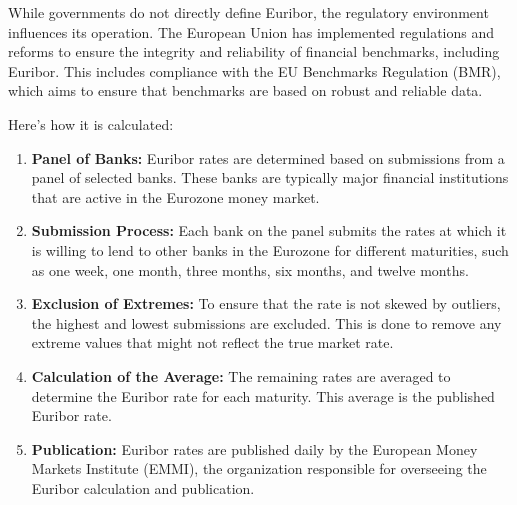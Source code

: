 \documentclass{article}
\begin{document}
While governments do not directly define Euribor, the regulatory environment influences its operation. The European Union has implemented regulations and reforms to ensure the integrity and reliability of financial benchmarks, including Euribor. This includes compliance with the EU Benchmarks Regulation (BMR), which aims to ensure that benchmarks are based on robust and reliable data.

Here's how it is calculated:

\begin{enumerate}
    \item \textbf{Panel of Banks:} Euribor rates are determined based on submissions from a panel of selected banks. These banks are typically major financial institutions that are active in the Eurozone money market.
    \item \textbf{Submission Process:} Each bank on the panel submits the rates at which it is willing to lend to other banks in the Eurozone for different maturities, such as one week, one month, three months, six months, and twelve months.
    \item \textbf{Exclusion of Extremes:} To ensure that the rate is not skewed by outliers, the highest and lowest submissions are excluded. This is done to remove any extreme values that might not reflect the true market rate.
    \item \textbf{Calculation of the Average:} The remaining rates are averaged to determine the Euribor rate for each maturity. This average is the published Euribor rate.
    \item \textbf{Publication:} Euribor rates are published daily by the European Money Markets Institute (EMMI), the organization responsible for overseeing the Euribor calculation and publication.
\end{enumerate}
\end{document}
